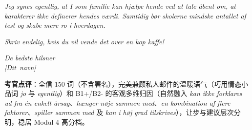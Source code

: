 \begin{answerbox}
\textit{Jeg synes egentlig, at I som familie kan hjælpe hende ved at tale åbent om, at karakterer ikke definerer hendes værdi. Samtidig bør skolerne mindske antallet af test og skabe mere ro i hverdagen.}

\textit{Skriv endelig, hvis du vil vende det over en kop kaffe!}

\textit{De bedste hilsner\\
\mbox{[Dit navn]}}

\small\textbf{考官点评}：全信 150 词（不含署名），完美兼顾私人邮件的温暖语气（巧用情态小品词 \textit{jo} 与 \textit{egentlig}）和 B1+/B2- 的客观多维归因（自然融入 \textit{kan ikke forklares ud fra én enkelt årsag}、\textit{hænger nøje sammen med}、\textit{en kombination af flere faktorer}、\textit{spiller sammen med} 及 \textit{kan i høj grad tilskrives}），让步与建议层次分明，稳居 Modul 4 高分档。
\end{answerbox}
